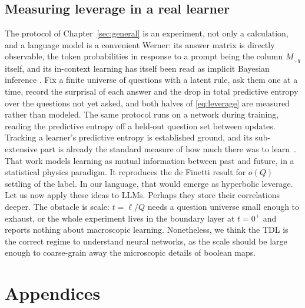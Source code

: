 \documentclass[11pt]{article}
\let\stdsection\section
\renewcommand{\section}{\clearpage\stdsection}
\begin{document}
\subsection{Measuring leverage in a real learner}

The protocol of Chapter~\ref{sec:general} is an experiment, not only a
calculation, and a language model is a convenient Werner:
its answer matrix is directly observable, the token probabilities in response to a prompt being the column $M_{\cdot,q}$ itself, and its in-context learning has
itself been read as implicit Bayesian inference \cite{xie22}. 
Fix a finite
universe of questions with a latent rule, ask them one at a time,
record the surprisal of each answer and the drop in total predictive
entropy over the questions not yet asked, and both halves of
\eqref{eq:leverage} are measured rather than modeled. The same
protocol runs on a network during training, reading the predictive
entropy off a held-out question set between updates. Tracking a
learner's predictive entropy is established ground, and its
sub-extensive part is already the standard measure of how much there
was to learn~\cite{bnt01}. That work models learning as mutual information between
past and future, in a statistical physics paradigm. It reproduces the de Finetti result
for $o(Q)$ settling of the label. In our language, that would emerge as hyperbolic leverage. 
Let us now apply these ideas to LLMs. Perhaps they store their correlations deeper.
The obstacle is
scale: $t = \ell/Q$ needs a question universe small enough to exhaust,
or the whole experiment lives in the boundary layer at $t = 0^+$ and
reports nothing about macroscopic learning. Nonetheless, we think the 
TDL is the correct regime to understand neural networks, as the scale should be large
enough to coarse-grain away the microscopic details of boolean maps.

\appendix

\clearpage
{}
\section*{Appendices}
\end{document}
